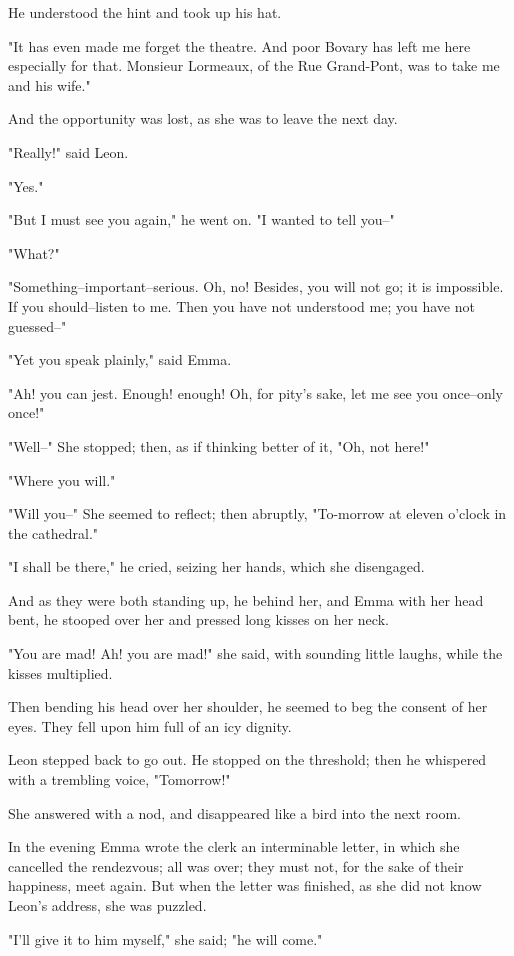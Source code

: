 \documentclass[11pt,twocolumn]{ltugboat}
\begin{document}
He understood the hint and took up his hat.

"It has even made me forget the theatre. And poor Bovary has left me
here especially for that. Monsieur Lormeaux, of the Rue Grand-Pont, was
to take me and his wife."

And the opportunity was lost, as she was to leave the next day.

"Really!" said Leon.

"Yes."

"But I must see you again," he went on. "I wanted to tell you--"

"What?"

"Something--important--serious. Oh, no! Besides, you will not go; it is
impossible. If you should--listen to me. Then you have not understood
me; you have not guessed--"

"Yet you speak plainly," said Emma.

"Ah! you can jest. Enough! enough! Oh, for pity's sake, let me see you
once--only once!"

"Well--" She stopped; then, as if thinking better of it, "Oh, not here!"

"Where you will."

"Will you--" She seemed to reflect; then abruptly, "To-morrow at eleven
o'clock in the cathedral."

"I shall be there," he cried, seizing her hands, which she disengaged.

And as they were both standing up, he behind her, and Emma with her head
bent, he stooped over her and pressed long kisses on her neck.

"You are mad! Ah! you are mad!" she said, with sounding little laughs,
while the kisses multiplied.

Then bending his head over her shoulder, he seemed to beg the consent of
her eyes. They fell upon him full of an icy dignity.

Leon stepped back to go out. He stopped on the threshold; then he
whispered with a trembling voice, "Tomorrow!"

She answered with a nod, and disappeared like a bird into the next room.

In the evening Emma wrote the clerk an interminable letter, in which she
cancelled the rendezvous; all was over; they must not, for the sake of
their happiness, meet again. But when the letter was finished, as she
did not know Leon's address, she was puzzled.

"I'll give it to him myself," she said; "he will come."
\end{document}

